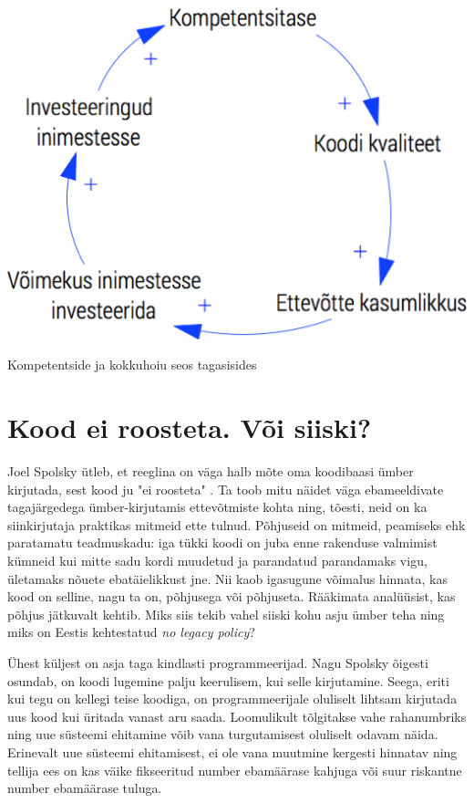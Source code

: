 \documentclass{tufte-book}
\begin{document}
\begin{marginfigure}
		\includegraphics[width=\linewidth]{kvaliteet.png}
		\caption{Kompetentside ja kokkuhoiu seos tagasisides}
		\label{fig:kokkuhoid}
\end{marginfigure}

\section{Kood ei roosteta. Või siiski?}
\label{sec:rooste}
Joel Spolsky ütleb, et reeglina on väga halb mõte oma koodibaasi ümber kirjutada, sest kood ju "ei roosteta" \citep{joelrust}. Ta toob mitu näidet väga ebameeldivate tagajärgedega ümber-kirjutamis ettevõtmiste kohta ning, tõesti, neid on ka siinkirjutaja praktikas mitmeid ette tulnud. Põhjuseid on mitmeid, peamiseks ehk paratamatu teadmuskadu: iga tükki koodi on juba enne rakenduse valmimist kümneid kui mitte sadu kordi muudetud ja parandatud parandamaks vigu, ületamaks nõuete ebatäielikkust jne. Nii kaob igasugune võimalus hinnata, kas kood on selline, nagu ta on, põhjusega või põhjuseta. Rääkimata analüüsist, kas põhjus jätkuvalt kehtib. Miks siis tekib vahel siiski kohu asju ümber teha ning miks on Eestis kehtestatud \emph{no legacy policy}?

Ühest küljest on asja taga kindlasti programmeerijad. Nagu Spolsky õigesti osundab, on koodi lugemine palju keerulisem, kui selle kirjutamine. Seega, eriti kui tegu on kellegi teise koodiga, on programmeerijale oluliselt lihtsam kirjutada uus kood kui üritada vanast aru saada. Loomulikult tõlgitakse vahe rahanumbriks ning uue süsteemi ehitamine võib vana turgutamisest oluliselt odavam näida. Erinevalt uue süsteemi ehitamisest, ei ole vana muutmine kergesti hinnatav ning tellija ees on kas väike fikseeritud number ebamäärase kahjuga või suur riskantne number ebamäärase tuluga. 
\end{document}
